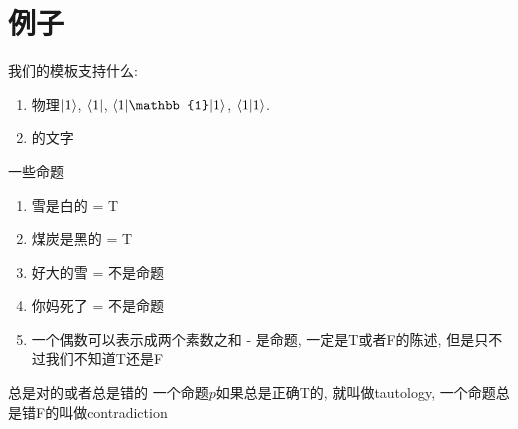 \documentclass[zihao=-4,a4paper]{ctexart}
\begin{document}
\section{例子}
我们的模板支持什么:
\begin{enumerate}
	\item 物理$\ket{1}$, $\bra{1}$, $\mel**{1}{\mathbb{1}}{1}$, $\braket{1}$.
	\item {}的文字
\end{enumerate}
\begin{mexample}{一些命题}
	\begin{enumerate}
		\item 雪是白的 = T
		\item 煤炭是黑的 = T
		\item 好大的雪 = 不是命题
		\item 你妈死了 = 不是命题
		\item 一个偶数可以表示成两个素数之和 - 是命题, 一定是T或者F的陈述, 但是只不过我们不知道T还是F
	\end{enumerate}
\end{mexample}
\begin{mdefinition}{总是对的或者总是错的}
	一个命题$p$如果总是正确T的, 就叫做tautology, 一个命题总是错F的叫做contradiction
\end{mdefinition}
\end{document}
